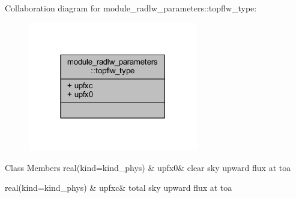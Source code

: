 Collaboration diagram for module\+\_\+radlw\+\_\+parameters\+:\+:topflw\+\_\+type\+:\nopagebreak
\begin{figure}[H]
\begin{center}
\leavevmode
\includegraphics[width=210pt]{structmodule__radlw__parameters_1_1topflw__type__coll__graph}
\end{center}
\end{figure}
\begin{DoxyFields}{Class Members}
real(kind=kind\+\_\+phys)\hypertarget{group__module__radlw__main_ga7080fda1f732474077aeb302b57351cb}{}\label{group__module__radlw__main_ga7080fda1f732474077aeb302b57351cb}
&
upfx0&
clear sky upward flux at toa \\
\hline

real(kind=kind\+\_\+phys)\hypertarget{group__module__radlw__main_ga19ff2669a279a1db869766c0e3d88981}{}\label{group__module__radlw__main_ga19ff2669a279a1db869766c0e3d88981}
&
upfxc&
total sky upward flux at toa \\
\hline

\end{DoxyFields}
